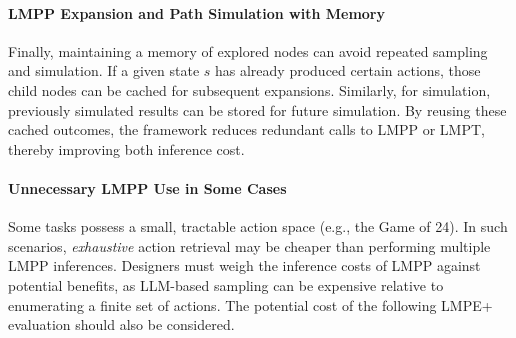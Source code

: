 
\paragraph{LMPP Expansion and Path Simulation with Memory}
Finally, maintaining a memory of explored nodes can avoid repeated sampling and simulation. If a given state \(s\) has already produced certain actions, those child nodes can be cached for subsequent expansions. Similarly, for simulation, previously simulated results can be stored for future simulation. By reusing these cached outcomes, the framework reduces redundant calls to LMPP or LMPT, thereby improving both inference cost.


\paragraph{Unnecessary LMPP Use in Some Cases}
Some tasks possess a small, tractable action space (e.g., the Game of 24). In such scenarios, \emph{exhaustive} action retrieval may be cheaper than performing multiple LMPP inferences. Designers must weigh the inference costs of LMPP against potential benefits, as LLM-based sampling can be expensive relative to enumerating a finite set of actions. The potential cost of the following LMPE+ evaluation should also be considered.


\subsection{}
\paragraph{ } 

